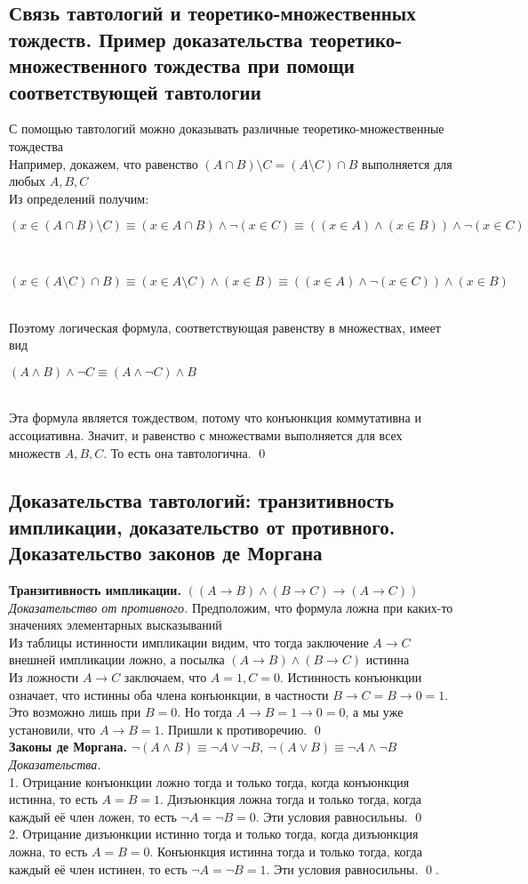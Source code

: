 \documentclass[a4paper]{article}
\begin{document}
\subsection{Связь тавтологий и теоретико-множественных тождеств. Пример доказательства теоретико-множественного тождества при помощи соответствующей тавтологии}
\label{sec:2.2}С помощью тавтологий можно доказывать различные теоретико-множественные тождества\\[2mm]
Например, докажем, что равенство $(A\cap B)\setminus C=(A\setminus C)\cap B$ выполняется для любых $A, B, C$\\[2mm]
Из определений получим:\\[2mm]
\centerline{$(x\in(A\cap B)\setminus C)\equiv (x\in A\cap B)\wedge\neg(x\in C)\equiv((x\in A)\wedge(x\in B))\wedge\neg(x\in C)$}\\[2mm]
\centerline{$(x\in (A\setminus C)\cap B)\equiv(x\in A\setminus C)\wedge(x\in B)\equiv((x\in A)\wedge\neg(x\in C))\wedge(x\in B)$}\\[2mm]
Поэтому логическая формула, соответствующая равенству в множествах, имеет вид\\[2mm]
\centerline{$(A\wedge B)\wedge\neg C\equiv(A\wedge\neg C)\wedge B$}\\[2mm]
Эта формула является тождеством, потому что конъюнкция коммутативна и ассоциативна. Значит, и равенство с множествами выполняется для всех множеств $A, B, C$. То есть она тавтологична. \qed
\subsection{Доказательства тавтологий: транзитивность импликации, доказательство от противного. Доказательство законов де Моргана}
\textbf{Транзитивность импликации.} $((A\rightarrow B)\wedge(B\rightarrow C)\rightarrow(A\rightarrow C))$\\[2mm]
\textit{Доказательство от противного.} Предположим, что формула ложна при каких-то значениях элементарных высказываний\\[2mm]
 Из таблицы истинности импликации видим, что тогда заключение $A\rightarrow C$ внешней импликации ложно, а посылка $(A\rightarrow B)\wedge(B\rightarrow C)$ истинна\\[2mm]
 Из ложности $A\rightarrow C$ заключаем, что $A=1, C=0$. Истинность конъюнкции означает, что истинны оба члена конъюнкции, в частности $B\rightarrow C=B\rightarrow0=1$. Это возможно лишь при $B=0$. Но тогда $A\rightarrow B=1\rightarrow0=0$, а мы уже установили, что $A\rightarrow B=1$. Пришли к противоречию. \qed\\[2mm]
\textbf{Законы де Моргана.} $\neg(A\wedge B)\equiv\neg A\vee\neg B,\ \neg(A\vee B)\equiv\neg A\wedge\neg B$\\[2mm]
\textit{Доказательства.}\\[2mm]
 1. Отрицание конъюнкции ложно тогда и только тогда, когда конъюнкция истинна, то есть $A = B = 1$. Дизъюнкция ложна тогда и только тогда, когда каждый её член ложен, то есть $\neg A=\neg B=0$. Эти условия равносильны. \qed\\[2mm]
 2. Отрицание дизъюнкции истинно тогда и только тогда, когда дизъюнкция ложна, то есть $A = B = 0$. Конъюнкция истинна тогда и только тогда, когда каждый её член истинен, то есть $\neg A=\neg B=1$. Эти условия равносильны. \qed.
\end{document}
